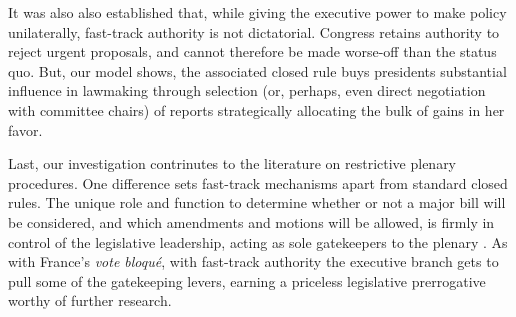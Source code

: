 \documentclass[letter,12pt]{article}
\begin{document}
It was also also established that, while giving the executive power to make policy unilaterally, fast-track authority is not dictatorial. Congress retains authority to reject urgent proposals, and cannot therefore be made worse-off than the status quo. But, our model shows, the associated closed rule buys presidents substantial influence in lawmaking through selection (or, perhaps, even direct negotiation with committee chairs) of reports strategically allocating the bulk of gains in her favor. 

Last, our investigation contrinutes to the literature on restrictive plenary procedures. One difference sets fast-track mechanisms apart from standard closed rules. The unique role and function to determine whether or not a major bill will be considered, and which amendments and motions will be allowed, is firmly in control of the legislative leadership, acting as sole gatekeepers to the plenary \citep{cox.2006}. As with France's \emph{vote bloqué}, with fast-track authority the executive branch gets to pull some of the gatekeeping levers, earning a priceless legislative prerrogative worthy of further research. 
 

\end{document}
